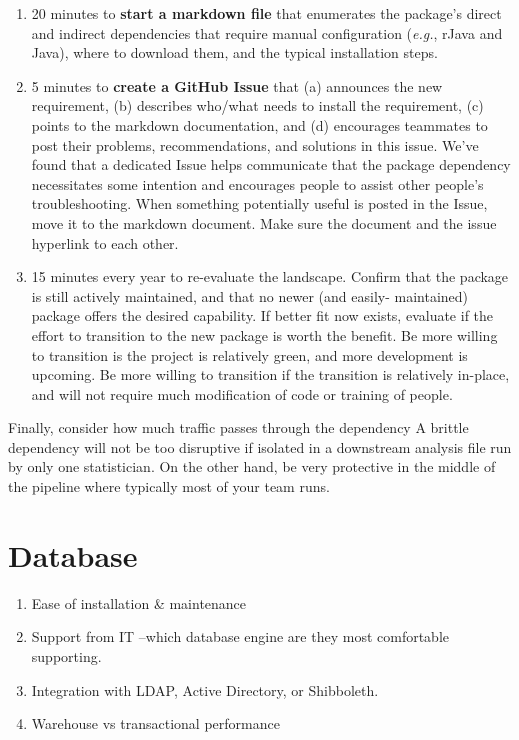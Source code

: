 \documentclass[]{book}
\begin{document}
\begin{enumerate}
  \begin{enumerate}
  \def\labelenumii{\arabic{enumii}.}
  \item
    20 minutes to \textbf{start a markdown file} that enumerates the package's direct and indirect dependencies that require manual configuration (\emph{e.g.}, rJava and Java), where to download them, and the typical installation steps.
  \item
    5 minutes to \textbf{create a GitHub Issue} that (a) announces the new requirement, (b) describes who/what needs to install the requirement, (c) points to the markdown documentation, and (d) encourages teammates to post their problems, recommendations, and solutions in this issue. We've found that a dedicated Issue helps communicate that the package dependency necessitates some intention and encourages people to assist other people's troubleshooting. When something potentially useful is posted in the Issue, move it to the markdown document. Make sure the document and the issue hyperlink to each other.
  \item
    15 minutes every year to re-evaluate the landscape. Confirm that the package is still actively maintained, and that no newer (and easily- maintained) package offers the desired capability. If better fit now exists, evaluate if the effort to transition to the new package is worth the benefit. Be more willing to transition is the project is relatively green, and more development is upcoming. Be more willing to transition if the transition is relatively in-place, and will not require much modification of code or training of people.
  \end{enumerate}
\end{enumerate}

Finally, consider how much traffic passes through the dependency A brittle dependency will not be too disruptive if isolated in a downstream analysis file run by only one statistician. On the other hand, be very protective in the middle of the pipeline where typically most of your team runs.

\hypertarget{database}{%
\section{Database}\label{database}}

\begin{enumerate}
\def\labelenumi{\arabic{enumi}.}
\item
  Ease of installation \& maintenance
\item
  Support from IT --which database engine are they most comfortable supporting.
\item
  Integration with LDAP, Active Directory, or Shibboleth.
\item
  Warehouse vs transactional performance
\end{enumerate}
\end{document}
